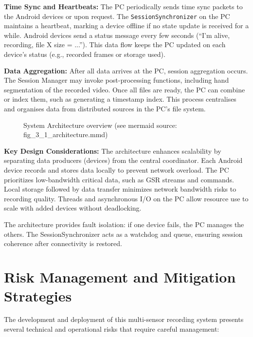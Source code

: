 \textbf{Time Sync and Heartbeats:} The PC periodically sends time sync packets to the Android devices or upon request. The \texttt{SessionSynchronizer} on the PC maintains a heartbeat, marking a device offline if no state update is received for a while. Android devices send a status message every few seconds (``I'm alive, recording, file X size = ...''). This data flow keeps the PC updated on each device's status (e.g., recorded frames or storage used).

\textbf{Data Aggregation:} After all data arrives at the PC, session aggregation occurs. The Session Manager may invoke post-processing functions, including hand segmentation of the recorded video. Once all files are ready, the PC can combine or index them, such as generating a timestamp index. This process centralises and organises data from distributed sources in the PC's file system.

\begin{figure}[ht]
    \centring
    \caption{System Architecture overview (see mermaid source: fig\_3\_1\_architecture.mmd)}
    \label{fig:figure_3_1_architecture}
\end{figure}

\textbf{Key Design Considerations:} The architecture enhances scalability by separating data producers (devices) from the central coordinator. Each Android device records and stores data locally to prevent network overload. The PC prioritizes low-bandwidth critical data, such as GSR streams and commands. Local storage followed by data transfer minimizes network bandwidth risks to recording quality. Threads and asynchronous I/O on the PC allow resource use to scale with added devices without deadlocking.

The architecture provides fault isolation: if one device fails, the PC manages the others. The SessionSynchronizer acts as a watchdog and queue, ensuring session coherence after connectivity is restored.


\section{Risk Management and Mitigation Strategies}
The development and deployment of this multi-sensor recording system presents several technical and operational risks that require careful management:

